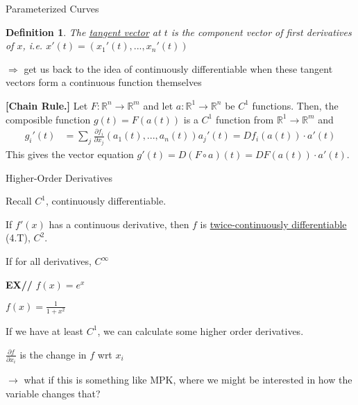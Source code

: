 \documentclass[xcolor=dvipsnames, compress, t]{beamer}
\newtheorem{defin}{Definition}
\newcommand{\vs}{\vspace{\baselineskip}}
\begin{document}
\begin{frame}{Parameterized Curves}

\begin{defin}
The \underline{tangent vector} at $t$ is the component vector of first derivatives of $x$, i.e. $x'(t) = (x_1'(t), ..., x_n'(t))$
\end{defin}
$\Rightarrow$ get us back to the idea of continuously differentiable when these tangent vectors form a continuous function themselves \pause

\begin{theorem}
{\bf [Chain Rule.]} Let $F:\mathds{R}^n \rightarrow \mathds{R}^m$ and let $a: \mathds{R}^1 \rightarrow \mathds{R}^n$ be $C^1$ functions. Then, the composible function $g(t) = F(a(t))$ is a $C^1$ function from $\mathds{R}^1 \rightarrow \mathds{R}^m$ and 
\begin{equation*}
\begin{aligned}
g_i'(t) &= \sum_j \frac{\partial f_i}{\partial x_j} \left( a_1(t), ..., a_n(t) \right) a_j'(t) = D f_i (a(t)) \cdot a'(t)
\end{aligned}
\end{equation*}
This gives the vector equation $g'(t) = D(F \circ a)(t) = D F(a(t)) \cdot a'(t)$.

\end{theorem}

\end{frame}



\begin{frame}{Higher-Order Derivatives}

Recall $C^1$, continuously differentiable.

\vs If $f'(x)$ has a continuous derivative, then $f$ is \underline{twice-continuously differentiable} (4.T), $C^2$. \pause

\vs If for all derivatives, $C^\infty$

\tabto{1cm} {\bf EX//} \tabto{3cm} $f(x) = e^x$

\tabto{3cm} $f(x) = \frac{1}{1+x^2}$ \pause

\vs If we have at least $C^1$, we can calculate some higher order derivatives.

\vs $\frac{\partial f}{\partial x_i}$ is the change in $f$ wrt $x_i$

$\rightarrow$ what if this is something like MPK, where we might be interested in how the variable changes that?

\end{frame}
\end{document}
